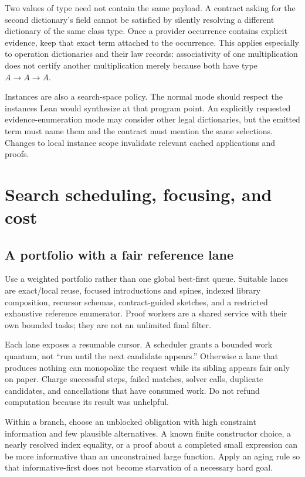 Two values of type  need not contain the same payload. A
contract asking for the second dictionary's field cannot be satisfied by
silently resolving a different dictionary of the same class type. Once a
provider occurrence contains explicit evidence, keep that exact term attached
to the occurrence. This applies especially to operation dictionaries and their
law records: associativity of one multiplication does not certify another
multiplication merely because both have type $A\to A\to A$.

Instances are also a search-space policy. The normal mode should respect the
instances Lean would synthesize at that program point. An explicitly requested
evidence-enumeration mode may consider other legal dictionaries, but the emitted
term must name them and the contract must mention the same selections. Changes
to local instance scope invalidate relevant cached applications and proofs.

\section{Search scheduling, focusing, and cost}\label{sec:scheduling}

\subsection{A portfolio with a fair reference lane}

Use a weighted portfolio rather than one global best-first queue. Suitable
lanes are exact/local reuse, focused introductions and spines, indexed library
composition, recursor schemas, contract-guided sketches, and a restricted
exhaustive reference enumerator. Proof workers are a shared service with their
own bounded tasks; they are not an unlimited final filter.

Each lane exposes a resumable cursor. A scheduler grants a bounded work quantum,
not ``run until the next candidate appears.'' Otherwise a lane that produces
nothing can monopolize the request while its sibling appears fair only on
paper. Charge successful steps, failed matches, solver calls, duplicate
candidates, and cancellations that have consumed work. Do not refund computation
because its result was unhelpful.

Within a branch, choose an unblocked obligation with high constraint information
and few plausible alternatives. A known finite constructor choice, a nearly
resolved index equality, or a proof about a completed small expression can be
more informative than an unconstrained large function. Apply an aging rule so
that informative-first does not become starvation of a necessary hard goal.

